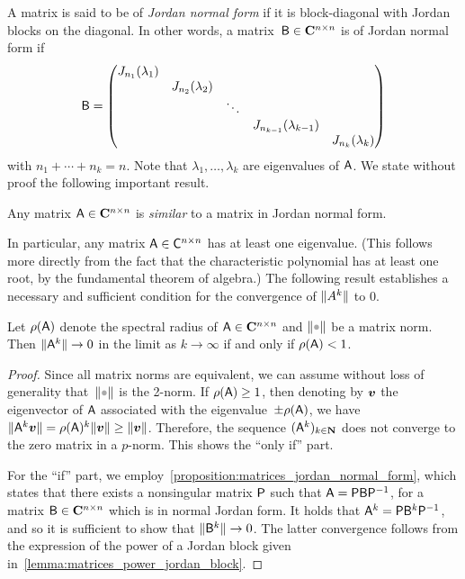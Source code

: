 A matrix is said to be of \emph{Jordan normal form} if it is block-diagonal with Jordan blocks on the diagonal.
In other words, a matrix~$\mathsf B \in \mathbf C^{n \times n}$ is of Jordan normal form if
\[
    \mathsf B =
        \begin{pmatrix}
            J_{n_1}(\lambda_1)  \\
                              & J_{n_2}(\lambda_2)    \\
                              &                 & \ddots  \\
                              &                 &         & J_{n_{k-1}}(\lambda_{k-1})   &   \\
                              &                 &         &                              & J_{n_k}(\lambda_k)
    \end{pmatrix}
\]
with $n_1 + \dotsb + n_k = n$.
Note that $\lambda_1, \dotsc, \lambda_k$ are eigenvalues of $\mathsf A$.
We state without proof the following important result.

\begin{proposition}
    \label{proposition:matrices_jordan_normal_form}
    Any matrix $\mathsf A \in \mathbf C^{n \times n}$ is \emph{similar} to a matrix in Jordan normal form.
\end{proposition}
In particular, any matrix $\mathsf A \in \mathsf C^{n \times n}$ has at least one eigenvalue.
(This follows more directly from the fact that the characteristic polynomial has at least one root,
by the fundamental theorem of algebra.)
The following result establishes a necessary and sufficient condition for the convergence of $\lVert A^k\rVert$ to 0.
\begin{proposition}
    Let $\rho(\mathsf A)$ denote the spectral radius of $\mathsf A \in \mathbf C^{n \times n}$ and $\norm{\placeholder}$ be a matrix norm.
    Then $\lVert\mathsf A^k\rVert \to 0$ in the limit as $k \to \infty$ if and only if $\rho(\mathsf A) < 1$.
\end{proposition}
\begin{proof}
    Since all matrix norms are equivalent,
    we can assume without loss of generality that~$\norm{\placeholder}$ is the 2-norm.
    If $\rho(\mathsf A) \geq 1$,
    then denoting by $\mathbf{\boldsymbol{v}}$ the eigenvector of $\mathsf A$ associated with the eigenvalue~$\pm \rho(\mathsf A)$,
    we have $\lVert\mathsf A^k \mathbf{\boldsymbol{v}}\rVert = \rho(\mathsf A)^k \lVert\mathbf{\boldsymbol{v}}\rVert \geq \lVert\mathbf{\boldsymbol{v}}\rVert$.
    Therefore, the sequence $(\mathsf A^k)_{k \in \mathbf N}$ does not converge to the zero matrix in a $p$-norm.
    This shows the ``only if'' part.

    For the ``if'' part,
    we employ~\cref{proposition:matrices_jordan_normal_form},
    which states that there exists a nonsingular matrix $\mathsf P$ such that $\mathsf A = \mathsf P \mathsf B \mathsf P^{-1}$,
    for a matrix $\mathsf B \in \mathbf C^{n \times n}$ which is in normal Jordan form.
    It holds that $\mathsf A^k = \mathsf P \mathsf B^k \mathsf P^{-1}$,
    and so it is sufficient to show that $\lVert\mathsf B^k\rVert \to 0$.
    The latter convergence follows from the expression of the power of a Jordan block given in~\cref{lemma:matrices_power_jordan_block}.
\end{proof}

